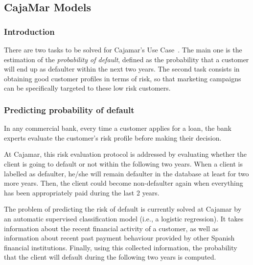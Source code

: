 

\newpage
\newpage
\newcommand{\X}{\mathbf{X}}
\newcommand{\Y}{\mathbf{Y}}
\newcommand{\Z}{\mathbf{Z}}
\newcommand{\x}{\mathbf{x}}
\newcommand{\argmax}[1]{\underset{#1}{\operatorname{arg}\,\operatorname{max}}\;}


\subsection{CajaMar Models}
\label{Section:CajaMarModels}

\subsubsection{Introduction}

There are two tasks to be solved for Cajamar's Use Case~\cite{Fer14b}. The main one is the estimation of the \emph{probability of default}, defined as the probability that a
customer will end up as defaulter within the next two years. The second task consists in obtaining good customer profiles in terms of risk, so that marketing campaigns can be specifically targeted to these low risk customers. 

\subsubsection{Predicting probability of default} \label{SubSection:Predicting}

In any commercial bank, every time a customer applies for a loan, the bank experts evaluate the customer's risk profile before making their decision. 

At Cajamar, this risk evaluation protocol is addressed by evaluating whether the client is going to default or not within the following two years. When a client is labelled as defaulter, he/she will remain defaulter in the database at least for two more years. Then, the client could become non-defaulter again when everything has been appropriately paid during the last 2 years. 

The problem of predicting the risk of default is currently solved at Cajamar by an automatic supervised classification model (i.e., a logistic regression). It takes information about the recent financial activity of a customer, as well as information about recent past payment behaviour provided by other Spanish financial institutions. Finally, using this collected information, the probability that the client will default during the following two years is computed. 

